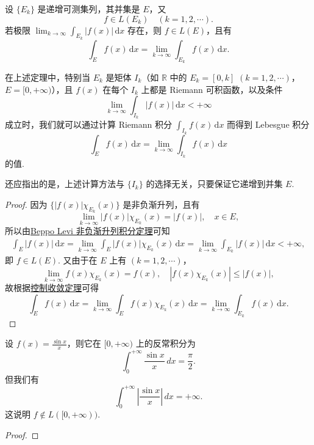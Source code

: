 \documentclass[../../main.tex]{subfiles}
\begin{document}
\begin{theorem}
设 \( \{ E_k \} \) 是递增可测集列，其并集是 \( E \)，又
\[
f \in L(E_k) \quad (k = 1, 2, \cdots).
\]
若极限 \( \lim_{k \to \infty} \int_{E_k} |f(x)| \, \mathrm{d}x \) 存在，则 \( f \in L(E) \)，且有
\[
\int_E f(x) \, \mathrm{d}x = \lim_{k \to \infty} \int_{E_k} f(x) \, \mathrm{d}x.
\]
\end{theorem}
\begin{remark}
在上述定理中，特别当 \( E_k \) 是矩体 \( I_k \)（如 \( \mathbb{R} \) 中的 \( E_k = [0, k] \) \( (k = 1, 2, \cdots) \)，\( E = [0, +\infty) \)），且 \( f(x) \) 在每个 \( I_k \) 上都是 Riemann 可积函数，以及条件
\[
\lim_{k \to \infty} \int_{I_k} |f(x)| \, \mathrm{d}x < +\infty
\]
成立时，我们就可以通过计算 Riemann 积分 \( \int_{I_k} f(x) \, \mathrm{d}x \) 而得到 Lebesgue 积分
\[
\int_E f(x) \, \mathrm{d}x = \lim_{k \to \infty} \int_{I_k} f(x) \, \mathrm{d}x
\]
的值.

还应指出的是，上述计算方法与 \( \{ I_k \} \) 的选择无关，只要保证它递增到并集 \( E \).
\end{remark}
\begin{proof}
因为 \( \{ |f(x)| \chi_{E_k}(x) \} \) 是非负渐升列，且有
\[
\lim_{k \to \infty} |f(x)| \chi_{E_k}(x) = |f(x)|, \quad x \in E,
\]
所以由\hyperref[theorem:Beppo Levi非负渐升列积分定理]{Beppo Levi 非负渐升列积分定理}可知
\begin{align*}
\int_E |f(x)| \, \mathrm{d}x = \lim_{k \to \infty} \int_E |f(x)| \chi_{E_k}(x) \, \mathrm{d}x = \lim_{k \to \infty} \int_{E_k} |f(x)| \, \mathrm{d}x < +\infty,
\end{align*}
即 \( f \in L(E) \). 又由于在 \( E \) 上有 \( (k = 1, 2, \cdots) \)，
\[
\lim_{k \to \infty} f(x) \chi_{E_k}(x) = f(x), \quad |f(x) \chi_{E_k}(x)| \leqslant |f(x)|,
\]
故根据\hyperref[theorem:控制收敛定理]{控制收敛定理}可得
\[
\int_E{f(x)\,\mathrm{d}x}=\lim_{k\rightarrow \infty} \int_E{f(x)\chi _{E_k}\left( x \right) \,\mathrm{d}x}=\lim_{k\rightarrow \infty} \int_{E_k}{f(x)\,\mathrm{d}x}.
\]
\end{proof}

\begin{example}
设 \( f(x) = \frac{\sin x}{x} \)，则它在 \( [0, +\infty) \) 上的反常积分为
\[
\int_0^{+\infty} \frac{\sin x}{x} \, dx = \frac{\pi}{2}.
\]
但我们有
\[
\int_0^{+\infty} \left| \frac{\sin x}{x} \right| \, dx = +\infty.
\]
这说明 \( f \notin L([0, +\infty)) \).
\end{example}
\begin{proof}

\end{proof}
\end{document}
